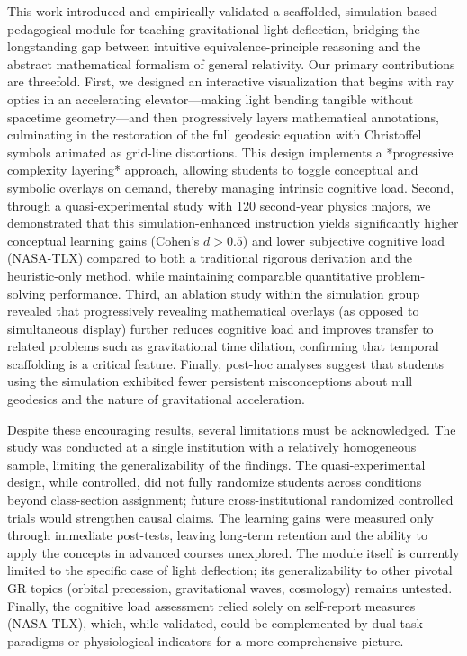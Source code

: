 \documentclass{article}
\begin{document}
\begin{itemize}
This work introduced and empirically validated a scaffolded, simulation-based pedagogical module for teaching gravitational light deflection, bridging the longstanding gap between intuitive equivalence-principle reasoning and the abstract mathematical formalism of general relativity. Our primary contributions are threefold. First, we designed an interactive visualization that begins with ray optics in an accelerating elevator—making light bending tangible without spacetime geometry—and then progressively layers mathematical annotations, culminating in the restoration of the full geodesic equation with Christoffel symbols animated as grid-line distortions. This design implements a *progressive complexity layering* approach, allowing students to toggle conceptual and symbolic overlays on demand, thereby managing intrinsic cognitive load. Second, through a quasi-experimental study with 120 second-year physics majors, we demonstrated that this simulation-enhanced instruction yields significantly higher conceptual learning gains (Cohen's \(d > 0.5\)) and lower subjective cognitive load (NASA-TLX) compared to both a traditional rigorous derivation and the heuristic-only method, while maintaining comparable quantitative problem-solving performance. Third, an ablation study within the simulation group revealed that progressively revealing mathematical overlays (as opposed to simultaneous display) further reduces cognitive load and improves transfer to related problems such as gravitational time dilation, confirming that temporal scaffolding is a critical feature. Finally, post-hoc analyses suggest that students using the simulation exhibited fewer persistent misconceptions about null geodesics and the nature of gravitational acceleration.

Despite these encouraging results, several limitations must be acknowledged. The study was conducted at a single institution with a relatively homogeneous sample, limiting the generalizability of the findings. The quasi-experimental design, while controlled, did not fully randomize students across conditions beyond class-section assignment; future cross-institutional randomized controlled trials would strengthen causal claims. The learning gains were measured only through immediate post-tests, leaving long-term retention and the ability to apply the concepts in advanced courses unexplored. The module itself is currently limited to the specific case of light deflection; its generalizability to other pivotal GR topics (orbital precession, gravitational waves, cosmology) remains untested. Finally, the cognitive load assessment relied solely on self-report measures (NASA-TLX), which, while validated, could be complemented by dual-task paradigms or physiological indicators for a more comprehensive picture.


\end{itemize}
\end{document}
